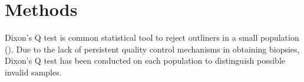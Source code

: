 \chapter{Methods}

Dixon's Q test is common statistical tool to reject outliners in a small population (). Due to the lack of persistent quality control mechanisms in obtaining biopsies, Dixon's Q test has been conducted on each population to distinguish possible invalid samples. 